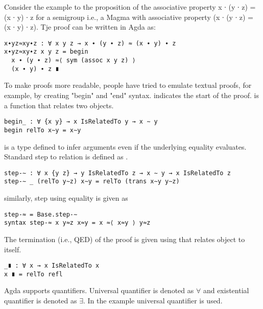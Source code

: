 Consider the example to the proposition of the associative property x ∙ (y ∙ z)
= (x ∙ y) ∙ z  for a semigroup i.e., a Magma with associative property (x ∙ (y ∙
z) = (x ∙ y) ∙ z). Tje proof can be written in Agda as:
\begin{verbatim}
x∙yz≈xy∙z : ∀ x y z → x ∙ (y ∙ z) ≈ (x ∙ y) ∙ z
x∙yz≈xy∙z x y z = begin 
  x ∙ (y ∙ z) ≈⟨ sym (assoc x y z) ⟩ 
  (x ∙ y) ∙ z ∎
\end{verbatim}
To make proofs more readable, people have tried to emulate textual proofs, for
example, by creating "begin" and "end" syntax.  indicates the start
of the proof.  is a function that relates two objects.
\begin{verbatim}
begin_ : ∀ {x y} → x IsRelatedTo y → x ∼ y
begin relTo x∼y = x∼y
\end{verbatim}
 is a type defined to infer arguments even if the underlying equality
evaluates. Standard step to relation is defined as .
\begin{verbatim}
step-∼ : ∀ x {y z} → y IsRelatedTo z → x ∼ y → x IsRelatedTo z
step-∼ _ (relTo y∼z) x∼y = relTo (trans x∼y y∼z)
\end{verbatim}
similarly, step using equality is given as
\begin{verbatim}
step-≈ = Base.step-∼
syntax step-≈ x y≈z x≈y = x ≈⟨ x≈y ⟩ y≈z
\end{verbatim}
The termination (i.e., QED) of the proof is given using  that relates object to itself.
\begin{verbatim}
_∎ : ∀ x → x IsRelatedTo x
x ∎ = relTo refl
\end{verbatim}
Agda supports quantifiers. Universal quantifier is denoted as \(\forall\) and
existential quantifier is denoted as \(\exists\). In the example universal quantifier is used.

